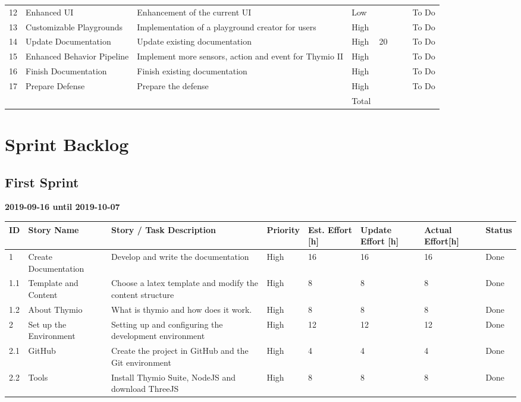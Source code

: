 \documentclass{scrbook}
\begin{document}
\begin{longtable}{p{5mm}|p{2cm}|p{4cm}|p{1cm}|p{1cm}|p{1cm}|p{1cm}|p{15mm}}
  12 & Enhanced UI & Enhancement of the current UI & Low &  &  &  & To Do \\ 
  13 & Customizable Playgrounds & Implementation of a playground creator for users & High &  &  &  & To Do \\ 
  14 & Update Documentation & Update existing documentation & High & 20 &  &  & To Do \\ 
  15 & Enhanced Behavior Pipeline & Implement more sensors, action and event for Thymio II & High &  &  &  & To Do \\ 
  16 & Finish Documentation & Finish existing documentation & High &  &  &  & To Do \\
  17 & Prepare Defense & Prepare the defense & High &  &  &  & To Do \\ 
   &  &  & Total &  &  &  &  \\ 
\end{longtable}

\chapter{Sprint Backlog}
\section{First Sprint}
\textbf{2019-09-16 until 2019-10-07}
\begin{longtable}{p{5mm}|p{2cm}|p{4cm}|p{1cm}|p{1cm}|p{1cm}|p{1cm}|p{15mm}}
  ID                     & Story Name & Story / Task Description & Priority & Est. Effort {[}h{]} & Update Effort {[}h{]} & Actual Effort{[}h{]} & Status                \\ \hline
  1 & Create Documentation & Develop and write the documentation & High & 16 & 16 & 16 & Done \\ 
  1.1 & Template and Content & Choose a latex template and modify the content structure & High & 8 & 8 & 8 & Done \\ 
  1.2 & About Thymio & What is thymio and how does it work. & High & 8 & 8 & 8 & Done \\ 
  2 & Set up the Environment & Setting up and configuring the development environment & High & 12 & 12 & 12 & Done \\ 
  2.1 & GitHub & Create the project in GitHub and the Git environment & High & 4 & 4 & 4 & Done \\ 
  2.2 & Tools & Install Thymio Suite, NodeJS and download ThreeJS & High & 8 & 8 & 8 & Done \\ 
\end{longtable}
\end{document}
